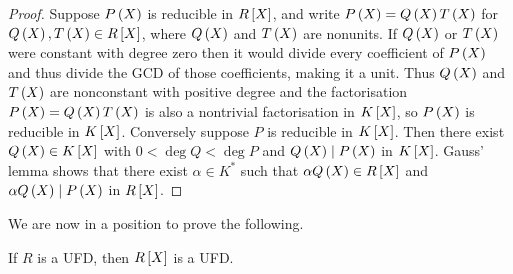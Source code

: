 \begin{proof}
Suppose $ P\br{X} $ is reducible in $ R\sbr{X} $, and write $ P\br{X} = Q\br{X}T\br{X} $ for $ Q\br{X}, T\br{X} \in R\sbr{X} $, where $ Q\br{X} $ and $ T\br{X} $ are nonunits. If $ Q\br{X} $ or $ T\br{X} $ were constant with degree zero then it would divide every coefficient of $ P\br{X} $ and thus divide the GCD of those coefficients, making it a unit. Thus $ Q\br{X} $ and $ T\br{X} $ are nonconstant with positive degree and the factorisation $ P\br{X} = Q\br{X}T\br{X} $ is also a nontrivial factorisation in $ K\sbr{X} $, so $ P\br{X} $ is reducible in $ K\sbr{X} $. Conversely suppose $ P $ is reducible in $ K\sbr{X} $. Then there exist $ Q\br{X} \in K\sbr{X} $ with $ 0 < \deg Q < \deg P $ and $ Q\br{X} \mid P\br{X} $ in $ K\sbr{X} $. Gauss' lemma shows that there exist $ \alpha \in K^* $ such that $ \alpha Q\br{X} \in R\sbr{X} $ and $ \alpha Q\br{X} \mid P\br{X} $ in $ R\sbr{X} $.
\end{proof}

We are now in a position to prove the following.

\begin{theorem}
If $ R $ is a UFD, then $ R\sbr{X} $ is a UFD.
\end{theorem}

